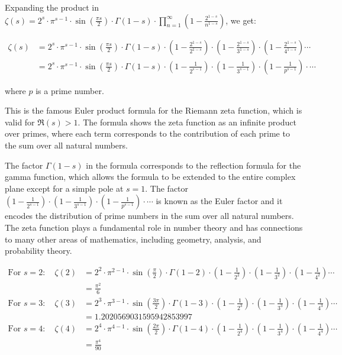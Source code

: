 \documentclass{article}
\begin{document}
Expanding the product in $\zeta(s) = 2^s \cdot \pi^{s-1} \cdot \sin(\frac{\pi s}{2}) \cdot \Gamma(1-s) \cdot \prod_{n=1}^\infty (1 - \frac{2^{1-s}}{n^{1-s}})$, we get:

\begin{align*}
\zeta(s) &= 2^s \cdot \pi^{s-1} \cdot \sin(\frac{\pi s}{2}) \cdot \Gamma(1-s) \cdot (1 - \frac{2^{1-s}}{2^{1-s}}) \cdot (1 - \frac{2^{1-s}}{3^{1-s}}) \cdot (1 - \frac{2^{1-s}}{4^{1-s}}) \cdots \\
&= 2^s \cdot \pi^{s-1} \cdot \sin(\frac{\pi s}{2}) \cdot \Gamma(1-s) \cdot (1 - \frac{1}{2^{s-1}}) \cdot (1 - \frac{1}{3^{s-1}}) \cdot (1 - \frac{1}{p^{s-1}}) \cdot \cdots
\end{align*}

where $p$ is a prime number.

This is the famous Euler product formula for the Riemann zeta function, which is valid for $\Re(s) > 1$. The formula shows the zeta function as an infinite product over primes, where each term corresponds to the contribution of each prime to the sum over all natural numbers.

The factor $\Gamma(1-s)$ in the formula corresponds to the reflection formula for the gamma function, which allows the formula to be extended to the entire complex plane except for a simple pole at $s=1$. The factor $(1 - \frac{1}{2^{s-1}}) \cdot (1 - \frac{1}{3^{s-1}}) \cdot (1 - \frac{1}{p^{s-1}}) \cdot \cdots$ is known as the Euler factor and it encodes the distribution of prime numbers in the sum over all natural numbers. The zeta function plays a fundamental role in number theory and has connections to many other areas of mathematics, including geometry, analysis, and probability theory.

\begin{align*}
\text{For } s = 2: \quad \zeta(2) &= 2^{2} \cdot \pi^{2-1} \cdot \sin(\frac{\pi}{2}) \cdot \Gamma(1-2) \cdot (1 - \frac{1}{2^2}) \cdot (1 - \frac{1}{3^2}) \cdot (1 - \frac{1}{4^2}) \cdots \\
&= \frac{\pi^2}{6} \\
\text{For } s = 3: \quad \zeta(3) &= 2^{3} \cdot \pi^{3-1} \cdot \sin(\frac{3\pi}{2}) \cdot \Gamma(1-3) \cdot (1 - \frac{1}{2^3}) \cdot (1 - \frac{1}{3^3}) \cdot (1 - \frac{1}{4^3}) \cdots \\
&= 1.2020569031595942853997 \\
\text{For } s = 4: \quad \zeta(4) &= 2^{4} \cdot \pi^{4-1} \cdot \sin(\frac{2\pi}{2}) \cdot \Gamma(1-4) \cdot (1 - \frac{1}{2^4}) \cdot (1 - \frac{1}{3^4}) \cdot (1 - \frac{1}{4^4}) \cdots \\
&= \frac{\pi^4}{90}
\end{align*}
\end{document}
